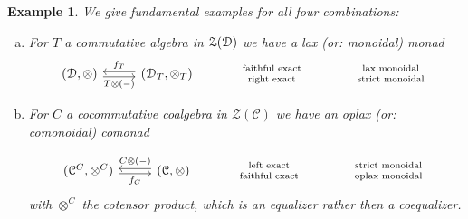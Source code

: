 \documentclass[a4paper, reqno]{amsart}
\newtheorem{example}[theorem]{Example}
\theoremstyle{introTheorems}
\newcommand\cC{\mathcal{C}}
\newcommand\cZ{\mathcal{Z}}
\renewcommand{\1}{\mathbbold{1}}
\begin{document}
\begin{example}\label{exm_fourmonoidalmonads}
We give fundamental examples for all four combinations:
\begin{enumerate}[(a)]
\item For $T$ a commutative algebra in $\cZ(\catD)$ we have a lax (or: monoidal) monad
\[\begin{tikzcd}[row sep=6ex, column sep=6ex]
\renewcommand{\arraystretch}{0.7}
(\catD,\otimes)
\arrow[r, leftarrow, shift right=-2pt,"\forget_T"]
\arrow[r, rightarrow, swap,shift right=2pt,"T\otimes(-)"]
& 
(\catD_T,\otimes_T)
&
\begin{array}{c}
    \scriptstyle \textnormal{faithful exact}\\
    \scriptstyle \textnormal{right exact} \\
\end{array}
&
\begin{array}{c}
    \scriptstyle \textnormal{lax monoidal}\\
    \scriptstyle \textnormal{strict monoidal} \\
\end{array}
\end{tikzcd}\]

\item For $C$ a cocommutative coalgebra in $\cZ(\cC)$ we have an oplax (or: comonoidal) comonad 

\[\begin{tikzcd}[row sep=6ex, column sep=6ex]
\renewcommand{\arraystretch}{0.7}
(\catC^C,\otimes^C)
\arrow[r, rightarrow, swap, shift right=2pt,"\forget_C"]
\arrow[r, leftarrow,shift right=-2pt,"C\otimes(-)"]
& 
(\catC,\otimes)
&
\begin{array}{c}
    \scriptstyle \textnormal{left exact}\\
    \scriptstyle \textnormal{faithful exact} \\
\end{array}
&
\begin{array}{c}
    \scriptstyle \textnormal{strict monoidal}\\
    \scriptstyle \textnormal{oplax monoidal} \\
\end{array}
\end{tikzcd}\]
with $\otimes^C$ the cotensor product, which is an equalizer rather then a coequalizer.


\end{enumerate}
\end{example}
\end{document}
